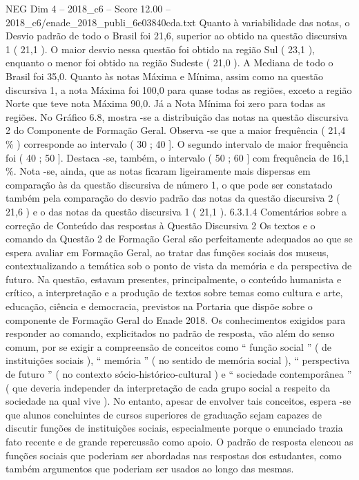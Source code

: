 \begin{textsample}{NEG Dim 4 – 2018\_c6 – Score 12.00 – 2018\_c6/enade\_2018\_publi\_6e03840cda.txt}
Quanto à variabilidade das notas, o Desvio padrão de todo o Brasil foi 21,6, superior ao obtido na questão discursiva 1 ( 21,1 ).
O maior desvio nessa questão foi obtido na região Sul ( 23,1 ), enquanto o menor foi obtido na região Sudeste ( 21,0 ).
A Mediana de todo o Brasil foi 35,0.
Quanto às notas Máxima e Mínima, assim como na questão discursiva 1, a nota Máxima foi 100,0 para quase todas as regiões, exceto a região Norte que teve nota Máxima 90,0.
Já a Nota Mínima foi zero para todas as regiões.
No Gráfico 6.8, mostra -se a distribuição das notas na questão discursiva 2 do Componente de Formação Geral.
Observa -se que a maior frequência ( 21,4 \% ) corresponde ao intervalo ( 30 ; 40 ].
O segundo intervalo de maior frequência foi ( 40 ; 50 ].
Destaca -se, também, o intervalo ( 50 ; 60 ] com frequência de 16,1 \%.
Nota -se, ainda, que as notas ficaram ligeiramente mais dispersas em comparação às da questão discursiva de número 1, o que pode ser constatado também pela comparação do desvio padrão das notas da questão discursiva 2 ( 21,6 ) e o das notas da questão discursiva 1 ( 21,1 ). 6.3.1.4 Comentários sobre a correção de Conteúdo das respostas à Questão Discursiva 2 Os textos e o comando da Questão 2 de Formação Geral são perfeitamente adequados ao que se espera avaliar em Formação Geral, ao tratar das funções sociais dos museus, contextualizando a temática sob o ponto de vista da memória e da perspectiva de futuro.
Na questão, estavam presentes, principalmente, o conteúdo humanista e crítico, a interpretação e a produção de textos sobre temas como cultura e arte, educação, ciência e democracia, previstos na Portaria que dispõe sobre o componente de Formação Geral do Enade 2018.
Os conhecimentos exigidos para responder ao comando, explicitados no padrão de resposta, vão além do senso comum, por se exigir a compreensão de conceitos como “ função social ” ( de instituições sociais ), “ memória ” ( no sentido de memória social ), “ perspectiva de futuro ” ( no contexto sócio-histórico-cultural ) e “ sociedade contemporânea ” ( que deveria independer da interpretação de cada grupo social a respeito da sociedade na qual vive ).
No entanto, apesar de envolver tais conceitos, espera -se que alunos concluintes de cursos superiores de graduação sejam capazes de discutir funções de instituições sociais, especialmente porque o enunciado trazia fato recente e de grande repercussão como apoio.
O padrão de resposta elencou as funções sociais que poderiam ser abordadas nas respostas dos estudantes, como também argumentos que poderiam ser usados ao longo das mesmas.

\end{textsample}
